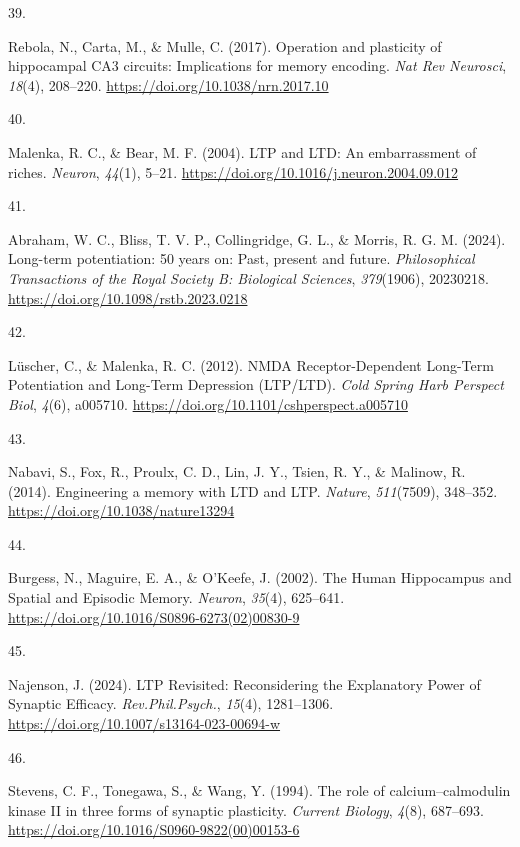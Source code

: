 \documentclass[
  11pt,
  letterpaper,
]{scrreprt}
\newlength{\cslhangindent}
\newlength{\csllabelwidth}
\newenvironment{CSLReferences}[2] %
 {\begin{list}{}{%
  \setlength{\itemindent}{0pt}
  \setlength{\leftmargin}{0pt}
  \setlength{\parsep}{0pt}
  \ifodd #1
   \setlength{\leftmargin}{\cslhangindent}
   \setlength{\itemindent}{-1\cslhangindent}
  \fi
  \setlength{\itemsep}{#2\baselineskip}}}
 {\end{list}}
\newcommand{\CSLLeftMargin}[1]{\parbox[t]{\csllabelwidth}{\strut#1\strut}}
\newcommand{\CSLRightInline}[1]{\parbox[t]{\linewidth - \csllabelwidth}{\strut#1\strut}}
\begin{document}
\begin{CSLReferences}{0}{0}
\CSLLeftMargin{39. }%
\CSLRightInline{Rebola, N., Carta, M., \& Mulle, C. (2017). Operation
and plasticity of hippocampal {CA3} circuits: Implications for memory
encoding. \emph{Nat Rev Neurosci}, \emph{18}(4), 208--220.
\url{https://doi.org/10.1038/nrn.2017.10}}

\CSLLeftMargin{40. }%
\CSLRightInline{Malenka, R. C., \& Bear, M. F. (2004). {LTP} and {LTD}:
An embarrassment of riches. \emph{Neuron}, \emph{44}(1), 5--21.
\url{https://doi.org/10.1016/j.neuron.2004.09.012}}

\CSLLeftMargin{41. }%
\CSLRightInline{Abraham, W. C., Bliss, T. V. P., Collingridge, G. L., \&
Morris, R. G. M. (2024). Long-term potentiation: 50 years on: Past,
present and future. \emph{Philosophical Transactions of the Royal
Society B: Biological Sciences}, \emph{379}(1906), 20230218.
\url{https://doi.org/10.1098/rstb.2023.0218}}

\CSLLeftMargin{42. }%
\CSLRightInline{Lüscher, C., \& Malenka, R. C. (2012). {NMDA
Receptor-Dependent Long-Term Potentiation} and {Long-Term Depression}
({LTP}/{LTD}). \emph{Cold Spring Harb Perspect Biol}, \emph{4}(6),
a005710. \url{https://doi.org/10.1101/cshperspect.a005710}}

\CSLLeftMargin{43. }%
\CSLRightInline{Nabavi, S., Fox, R., Proulx, C. D., Lin, J. Y., Tsien,
R. Y., \& Malinow, R. (2014). Engineering a memory with {LTD} and {LTP}.
\emph{Nature}, \emph{511}(7509), 348--352.
\url{https://doi.org/10.1038/nature13294}}

\CSLLeftMargin{44. }%
\CSLRightInline{Burgess, N., Maguire, E. A., \& O'Keefe, J. (2002). The
{Human Hippocampus} and {Spatial} and {Episodic Memory}. \emph{Neuron},
\emph{35}(4), 625--641.
\url{https://doi.org/10.1016/S0896-6273(02)00830-9}}

\CSLLeftMargin{45. }%
\CSLRightInline{Najenson, J. (2024). {LTP Revisited}: {Reconsidering}
the {Explanatory Power} of {Synaptic Efficacy}. \emph{Rev.Phil.Psych.},
\emph{15}(4), 1281--1306.
\url{https://doi.org/10.1007/s13164-023-00694-w}}

\CSLLeftMargin{46. }%
\CSLRightInline{Stevens, C. F., Tonegawa, S., \& Wang, Y. (1994). The
role of calcium--calmodulin kinase {II} in three forms of synaptic
plasticity. \emph{Current Biology}, \emph{4}(8), 687--693.
\url{https://doi.org/10.1016/S0960-9822(00)00153-6}}


\end{CSLReferences}
\end{document}
